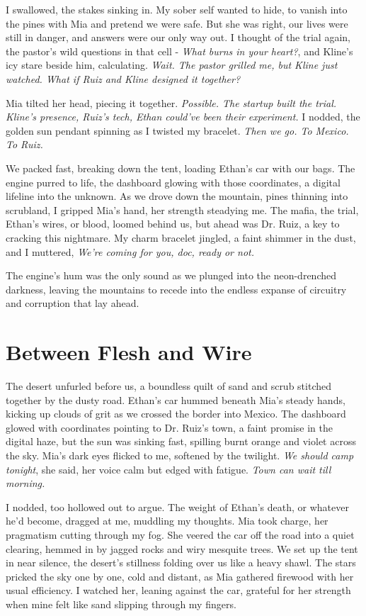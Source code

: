 \documentclass[12pt,oneside]{book}
\begin{document}
I swallowed, the stakes sinking in. My sober self wanted to hide, to vanish into the pines with Mia and pretend we were safe. But she was right, our lives were still in danger, and answers were our only way out. I thought of the trial again, the pastor’s wild questions in that cell - \textit{What burns in your heart?}, and Kline’s icy stare beside him, calculating. \textit{Wait. The pastor grilled me, but Kline just watched. What if Ruiz and Kline designed it together?}

Mia tilted her head, piecing it together. \textit{Possible. The startup built the trial. Kline’s presence, Ruiz’s tech, Ethan could’ve been their experiment.} I nodded, the golden sun pendant spinning as I twisted my bracelet. \textit{Then we go. To Mexico. To Ruiz.}

We packed fast, breaking down the tent, loading Ethan’s car with our bags. The engine purred to life, the dashboard glowing with those coordinates, a digital lifeline into the unknown. As we drove down the mountain, pines thinning into scrubland, I gripped Mia’s hand, her strength steadying me. The mafia, the trial, Ethan’s wires, or blood, loomed behind us, but ahead was Dr. Ruiz, a key to cracking this nightmare. My charm bracelet jingled, a faint shimmer in the dust, and I muttered, \textit{We’re coming for you, doc, ready or not.}

The engine's hum was the only sound as we plunged into the neon-drenched darkness, leaving the mountains to recede into the endless expanse of circuitry and corruption that lay ahead.

\chapter{Between Flesh and Wire}

The desert unfurled before us, a boundless quilt of sand and scrub stitched together by the dusty road. Ethan's car hummed beneath Mia’s steady hands, kicking up clouds of grit as we crossed the border into Mexico. The dashboard glowed with coordinates pointing to Dr. Ruiz’s town, a faint promise in the digital haze, but the sun was sinking fast, spilling burnt orange and violet across the sky. Mia’s dark eyes flicked to me, softened by the twilight. \textit{We should camp tonight}, she said, her voice calm but edged with fatigue. \textit{Town can wait till morning.}

I nodded, too hollowed out to argue. The weight of Ethan’s death, or whatever he’d become, dragged at me, muddling my thoughts. Mia took charge, her pragmatism cutting through my fog. She veered the car off the road into a quiet clearing, hemmed in by jagged rocks and wiry mesquite trees. We set up the tent in near silence, the desert’s stillness folding over us like a heavy shawl. The stars pricked the sky one by one, cold and distant, as Mia gathered firewood with her usual efficiency. I watched her, leaning against the car, grateful for her strength when mine felt like sand slipping through my fingers.
\end{document}
